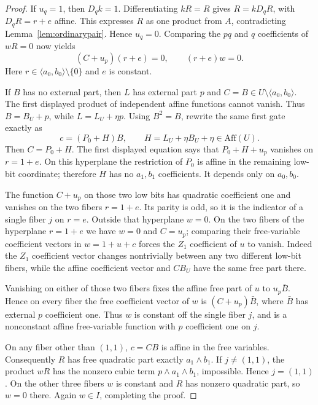 \documentclass[11pt,a4paper]{article}
\newcommand{\Aff}{\mathrm{Aff}}
\begin{document}
\begin{proof}
If $u_q=1$, then $D_qk=1$. Differentiating $kR=R$ gives $R=kD_qR$, with $D_qR=r+e$ affine. This expresses $R$ as one product from $A$, contradicting Lemma~\ref{lem:ordinarypair}. Hence $u_q=0$. Comparing the $pq$ and $q$ coefficients of $wR=0$ now yields
\[
(C+u_p)(r+e)=0,\qquad (r+e)w=0.
\]
Here $r\in\langle a_0,b_0\rangle\setminus\{0\}$ and $e$ is constant.

If $B$ has no external part, then $L$ has external part $p$ and $C=B\in U\setminus\langle a_0,b_0\rangle$. The first displayed product of independent affine functions cannot vanish. Thus $B=B_U+p$, while $L=L_U+\eta p$. Using $B^2=B$, rewrite the same first gate exactly as
\[
c=(P_0+H)B,\qquad H=L_U+\eta B_U+\eta\in\Aff(U).
\]
Then $C=P_0+H$. The first displayed equation says that $P_0+H+u_p$ vanishes on $r=1+e$. On this hyperplane the restriction of $P_0$ is affine in the remaining low-bit coordinate; therefore $H$ has no $a_1,b_1$ coefficients. It depends only on $a_0,b_0$.

The function $C+u_p$ on those two low bits has quadratic coefficient one and vanishes on the two fibers $r=1+e$. Its parity is odd, so it is the indicator of a single fiber $j$ on $r=e$. Outside that hyperplane $w=0$. On the two fibers of the hyperplane $r=1+e$ we have $w=0$ and $C=u_p$; comparing their free-variable coefficient vectors in $w=1+u+c$ forces the $Z_1$ coefficient of $u$ to vanish. Indeed the $Z_1$ coefficient vector changes nontrivially between any two different low-bit fibers, while the affine coefficient vector and $CB_U$ have the same free part there.

Vanishing on either of those two fibers fixes the affine free part of $u$ to $u_p\bar B$. Hence on every fiber the free coefficient vector of $w$ is $(C+u_p)\bar B$, where $\bar B$ has external $p$ coefficient one. Thus $w$ is constant off the single fiber $j$, and is a nonconstant affine free-variable function with $p$ coefficient one on $j$.

On any fiber other than $(1,1)$, $c=CB$ is affine in the free variables. Consequently $R$ has free quadratic part exactly $a_1\wedge b_1$. If $j\ne(1,1)$, the product $wR$ has the nonzero cubic term $p\wedge a_1\wedge b_1$, impossible. Hence $j=(1,1)$. On the other three fibers $w$ is constant and $R$ has nonzero quadratic part, so $w=0$ there. Again $w\in I$, completing the proof.
\end{proof}
\end{document}

